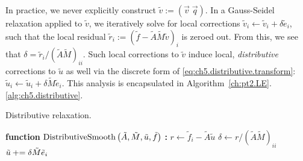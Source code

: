 In practice, we never explicitly construct $\tilde{v} := (\vec{v} \; \vec{q})$. In a Gauss-Seidel relaxation applied to $\tilde{v}$, we iteratively solve for local corrections $\tilde{v}_i \leftarrow \tilde{v}_i + \delta \tilde{e}_i$, such that the local residual $\tilde{r}_i := (\tilde{f} - \tilde{A} \tilde{M} \tilde{v})_i$ is zeroed out. From this, we see that $\delta = \tilde{r}_i / (\tilde{A} \tilde{M})_{ii}$. Such local corrections to $\tilde{v}$ induce local, \emph{distributive} corrections to $\tilde{u}$ as well via the discrete form of \eqref{eq:ch5.distributive.transform}: $\tilde{u}_i \leftarrow \tilde{u}_i + \delta \tilde{M} \tilde{e}_i$. This analysis is encapsulated in Algorithm~\ref{ch:pt2.LE}.\ref{alg:ch5.distributive}.

\begin{algorithm}[htbp]
\caption{Distributive relaxation.}
\label{alg:ch5.distributive}
\begin{algorithmic}[1]
\STATE \textbf{function} $\operatorname{DistributiveSmooth} \left( \tilde{A}, \tilde{M}, \tilde{u}, \tilde{f} \right)$ \textbf{:}
        \STATE $r \leftarrow \tilde{f}_i - \tilde{A} \tilde{u}$
        \STATE $\delta \leftarrow r / (\tilde{A} \tilde{M})_{ii}$
        \STATE $\tilde{u} +{}\!\!\!= \delta \tilde{M} \tilde{e}_i$
    \ENDFOR
\ENDFOR
\end{algorithmic}
\end{algorithm}

